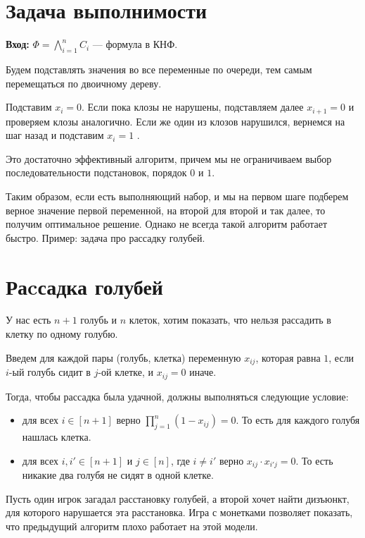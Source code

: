 \section{Задача выполнимости}
\textbf{Вход:} $ \Phi = \bigwedge\limits_{i=1}^n C_i $  --- формула в КНФ.

Будем подставлять значения во все переменные по очереди, тем самым перемещаться по двоичному дереву.

Подставим $ x_i = 0$. Если пока клозы не нарушены, подставляем далее $ x_{i+1} = 0$ и проверяем клозы аналогично. Если же один из клозов нарушился, вернемся на шаг назад и подставим $  x_i = 1$ .

\begin{figure}[ht]
    \centering
    \label{fig:cnf-algo}
\end{figure}

Это достаточно эффективный алгоритм, причем мы не ограничиваем выбор последовательности подстановок, порядок $ 0$ и $ 1$.

Таким образом, если есть выполняющий набор, и мы на первом шаге подберем верное значение первой переменной, на второй для второй и так далее, то получим оптимальное решение. Однако не всегда такой алгоритм работает быстро. Пример: задача про рассадку голубей.

\section{Раcсадка голубей}
У нас есть $n+1$ голубь и $n$ клеток, хотим показать, что нельзя рассадить в клетку по одному голубю.

Введем для каждой пары (голубь, клетка) переменную $ x_{ij}$, которая равна $ 1$, если $ i$-ый голубь сидит в $ j$-ой клетке, и $ x_{ij} = 0$ иначе.

Тогда, чтобы рассадка была удачной, должны выполняться следующие условие: 
\begin{itemize}
	\item для всех $i \in [n+1]$ верно $ \prod_{j=1}^{n} (1-x_{ij}) = 0$. То есть для каждого голубя нашлась клетка.
	\item для всех $ i, i'\in [n+1]$ и $ j \in [n]$, где  $ i \ne i'$ верно $x_{ij} \cdot x_{i'j} = 0$. То есть никакие два голубя не сидят в одной клетке.
\end{itemize}
Пусть один игрок загадал расстановку голубей, а второй хочет найти дизъюнкт, для которого нарушается эта расстановка. 
Игра с монетками позволяет показать, что предыдущий алгоритм плохо работает на этой модели.

